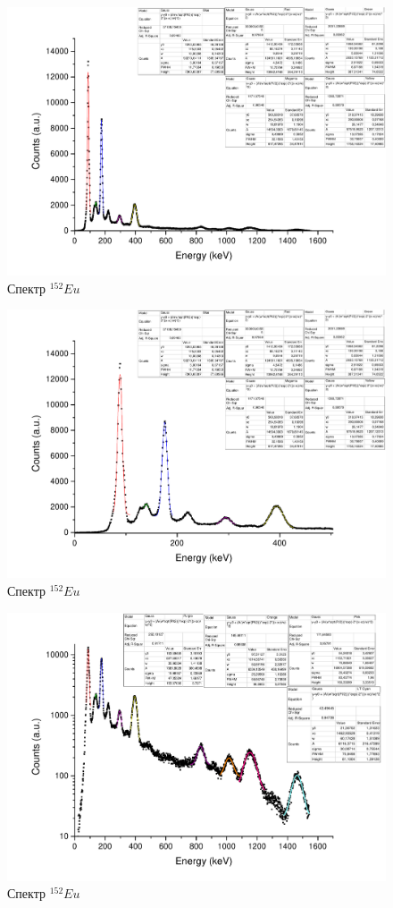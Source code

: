 \documentclass[a4paper,12pt]{article}
\begin{document}
	        \begin{figure}[h!]
	            \centering
	            \includegraphics[width=0.8\linewidth]{eu152.pdf}
	            \caption{Спектр $^{152}Eu$}
	            \label{cs137_e}
	        \end{figure}
	        
	        \begin{figure}[h!]
	            \centering
	            \includegraphics[width=0.8\linewidth]{eu152_enl.pdf}
	            \caption{Спектр $^{152}Eu$}
	            \label{cs137_e}
	        \end{figure}
	        
	        \begin{figure}[h!]
	            \centering
	            \includegraphics[width=0.8\linewidth]{eu152_log.pdf}
	            \caption{Спектр $^{152}Eu$}
	            \label{cs137_e}
	        \end{figure}
	        
\end{document}

